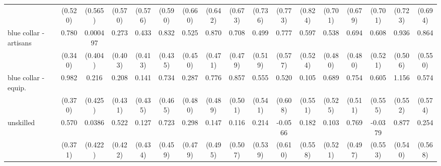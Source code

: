 {\begin{tabular}{l*{16}{c}}
                    &     (0.520)         &     (0.565)         &     (0.570)         &     (0.576)         &     (0.590)         &     (0.660)         &     (0.642)         &     (0.673)         &     (0.736)         &     (0.773)         &     (0.824)         &     (0.701)         &     (0.679)         &     (0.701)         &     (0.723)         &     (0.694)         \\
[1em]
blue collar - artisans&       0.780\sym{*}  &    0.000497         &       0.273         &       0.433         &       0.832         &       0.525         &       0.870         &       0.708         &       0.499         &       0.777         &       0.597         &       0.538         &       0.694         &       0.608         &       0.936         &       0.864         \\
                    &     (0.340)         &     (0.404)         &     (0.403)         &     (0.413)         &     (0.435)         &     (0.450)         &     (0.471)         &     (0.479)         &     (0.519)         &     (0.577)         &     (0.524)         &     (0.480)         &     (0.480)         &     (0.521)         &     (0.506)         &     (0.550)         \\
[1em]
blue collar - equip.&       0.982\sym{**} &       0.216         &       0.208         &       0.141         &       0.734         &       0.287         &       0.776         &       0.857         &       0.555         &       0.520         &       0.105         &       0.689         &       0.754         &       0.605         &       1.156\sym{*}  &       0.574         \\
                    &     (0.370)         &     (0.425)         &     (0.431)         &     (0.435)         &     (0.465)         &     (0.480)         &     (0.489)         &     (0.501)         &     (0.541)         &     (0.608)         &     (0.551)         &     (0.525)         &     (0.511)         &     (0.555)         &     (0.552)         &     (0.574)         \\
[1em]
unskilled           &       0.570         &      0.0386         &       0.522         &       0.127         &       0.723         &       0.298         &       0.147         &       0.116         &       0.214         &     -0.0566         &       0.182         &       0.103         &       0.769         &     -0.0379         &       0.877         &       0.254         \\
                    &     (0.371)         &     (0.422)         &     (0.422)         &     (0.434)         &     (0.459)         &     (0.479)         &     (0.495)         &     (0.507)         &     (0.539)         &     (0.610)         &     (0.558)         &     (0.521)         &     (0.497)         &     (0.553)         &     (0.540)         &     (0.568)         \\

\end{tabular}}
